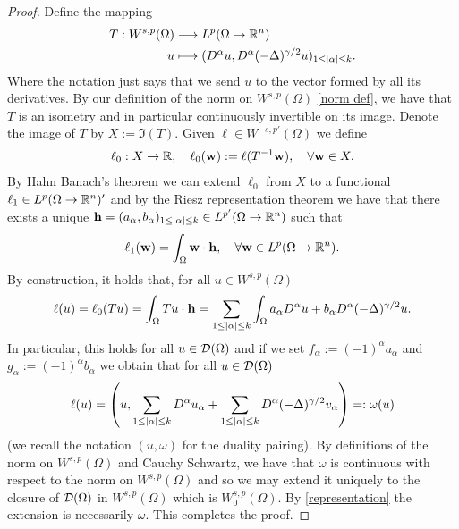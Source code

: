 \documentclass[12pt]{article}
\theoremstyle{definition}
\begin{document}
\begin{proof}
	Define the mapping
	\begin{align*}
		T: W^{s,p}(\Omega ) & \longrightarrow L^p(\Omega \to \mathbb{R}^n)                                                   \\
		u                   & \longmapsto(D^\alpha u, D^\alpha (-\Delta )^{\gamma /2} u)_{1 \leq\left| \alpha \right|\leq k}.
	\end{align*}
	Where the notation just says that we send $u$ to the vector formed by all its derivatives. By our definition of the norm on $W^{s,p}(\Omega )$ \eqref{norm def}, we have that $T$ is an isometry and in particular continuously invertible on its image. Denote the image of $T$ by $X:=\Im(T)$. Given $\ell \in W^{-s,p'}(\Omega )$ we define
	\begin{align*}
		\ell_0: X \to \mathbb{R}, \quad \ell_0(\vb{w}):= \ell(T^{-1}\vb{w}), \quad \forall \vb{w} \in X.
	\end{align*}
	By Hahn Banach's theorem we can extend $\ell_0$ from $X$ to a functional $\ell_1 \in  L^p(\Omega \to \mathbb{R}^n)'$ and by the Riesz representation theorem we have that there exists a unique $\vb{h}=(a_\alpha, b_\alpha)_{1\leq \left| \alpha \right|\leq k }\in L^{p'}(\Omega \to \mathbb{R}^n)$ such that
	\begin{align*}
		\ell_1(\vb{w})=\int_{\Omega}\vb{w}\cdot \vb{h}, \quad \forall \vb{w} \in L^p(\Omega \to \mathbb{R}^n).
	\end{align*}
	By construction, it holds that, for all $u \in W^{s,p}(\Omega )$
	\begin{align*}
		\ell(u)=\ell_0(Tu)=\int_{\Omega}Tu\cdot \vb{h}=\sum_{1\leq\left| \alpha \right|\leq k}\int_{\Omega}a_\alpha D^\alpha u  +b_\alpha D^\alpha (-\Delta )^{\gamma /2}u.
	\end{align*}
	In particular, this holds for all $u \in \mathcal{D}(\Omega )$ and if we set $f_\alpha:=(-1)^\alpha a_\alpha$ and $g_\alpha:=(-1)^\alpha b_\alpha$ we obtain that for all $u \in \mathcal{D}(\Omega )$
	\begin{align}\label{representation}
		\ell(u)=\left(u,\sum_{1\leq\left| \alpha \right|\leq k} D^\alpha u_\alpha+ \sum_{1\leq\left| \alpha \right|\leq k} D^\alpha (-\Delta )^{\gamma /2}v_\alpha\right)=: \omega(u)
	\end{align}
	(we recall the notation $(u,\omega)$ for the duality pairing). By definitions of the norm on $W^{s,p}(\Omega )$ and Cauchy Schwartz, we have that $\omega$ is continuous with respect to the norm on $W^{s,p}(\Omega )$ and so we may extend it uniquely to the closure of $\mathcal{D}(\Omega )$ in $W^{s,p}(\Omega )$ which is $W^{s,p}_0(\Omega )$. By \eqref{representation} the extension is necessarily $\omega$. This completes the proof.
\end{proof}
\end{document}
